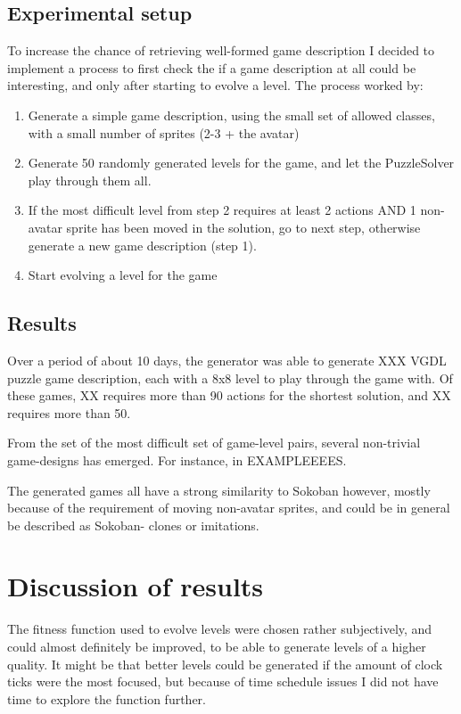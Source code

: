 \documentclass[a4paper,titlepage,final]{report}
\begin{document}
\subsection{Experimental setup} 
To increase the chance of retrieving well-formed game description I decided to implement a process to first check the if a game description at all could be interesting, and only after starting to evolve a level.
The process worked by:

\begin{enumerate}
\item Generate a simple game description, using the small set of allowed classes, with a small number of sprites (2-3 + the avatar)
\item Generate 50 randomly generated levels for the game, and let the PuzzleSolver play through them all.
\item If the most difficult level from step 2 requires at least 2 actions AND 1 non-avatar sprite has been moved in the solution, go to next step, otherwise generate a new game description (step 1).
\item Start evolving a level for the game
\end{enumerate}



\subsection{Results} 
Over a period of about 10 days, the generator was able to generate XXX VGDL puzzle game description, each with a 8x8 level to play through the game with.
Of these games, XX requires more than 90 actions for the shortest solution, and XX requires more than 50.

From the set of the most difficult set of game-level pairs, several non-trivial game-designs has emerged.
For instance, in 
EXAMPLEEEES.  

The generated games all have a strong similarity to Sokoban however, mostly because of the requirement of moving non-avatar sprites, and could be in general be described as Sokoban- clones or imitations.

\section{Discussion of results} 
\label{sec_task3discussion}
The fitness function used to evolve levels were chosen rather subjectively, and could almost definitely be improved, to be able to generate levels of a higher quality.
It might be that better levels could be generated if the amount of clock ticks were the most focused, but because of time schedule issues I did not have time to explore the function further.
\end{document}
